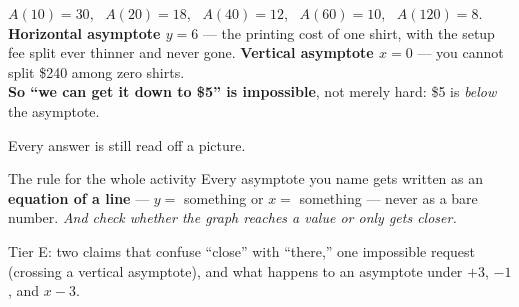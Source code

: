 \documentclass[aspectratio=169, 11pt]{beamer}
\begin{document}
\begin{frame}[t, plain]
  \begin{center}
  \end{center}
  \vspace{-0.3cm}
  \small
  $A(10)=30$, \ $A(20)=18$, \ $A(40)=12$, \ $A(60)=10$, \ $A(120)=8$.\\
  \textbf{Horizontal asymptote $y=6$} --- the printing cost of one shirt, with the setup fee split
  ever thinner and never gone. \textbf{Vertical asymptote $x=0$} --- you cannot split \$240 among
  zero shirts.\\
  \textbf{So ``we can get it down to \$5'' is impossible}, not merely hard: \$5 is \emph{below} the
  asymptote.
\end{frame}

\begin{frame}[t, plain]
  Every answer is still read off a picture.
  \begin{block}{The rule for the whole activity}
    Every asymptote you name gets written as an \textbf{equation of a line} --- $y=$ something or
    $x=$ something --- never as a bare number. \emph{And check whether the graph reaches a value or
    only gets closer.}
  \end{block}
  \vspace{0.1cm}
  Tier E: two claims that confuse ``close'' with ``there,'' one impossible request (crossing a
  vertical asymptote), and what happens to an asymptote under $+3$, $-1$, and $x-3$.
\end{frame}
\end{document}
